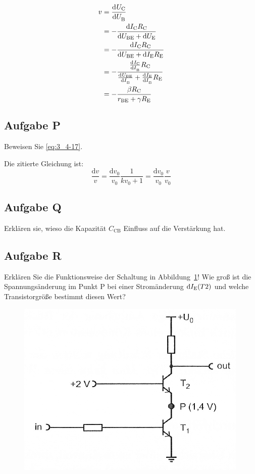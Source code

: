 \begin{align*}
	v &= \dod \UC\UB\\
	  &= -\frac{\dif\IC\RC}{\dif\UBE + \dif\UE}\\
	  &= -\frac{\dif\IC\RC}{\dif\UBE + \dif\IE\RE}\\
	  &= -\frac{\od\IC\IB\RC}{\od\UBE\IB+\od\IE\IB\RE}\\
	  &= -\frac{\beta\RC}{r_\text{BE}+\gamma\RE}
\end{align*}

\FloatBarrier
\subsection{Aufgabe P}

\begin{problem}
	Beweisen Sie \eqref{eq:3_4-17}.
\end{problem}

Die zitierte Gleichung ist:
\begin{equation}
	\label{eq:3_4-17}
	\frac{\mathrm d v} v
	= \frac{\mathrm d v_0}{v_0} \frac{1}{k v_0 + 1}
	= \frac{\mathrm d v_0}{v_0} \frac{v}{v_0}
\end{equation}

\fehlt

\FloatBarrier
\subsection{Aufgabe Q}

\begin{problem}
	Erklären sie, wieso die Kapazität $C_\text{CB}$ Einfluss auf die
	Verstärkung hat.
\end{problem}

\fehlt

\FloatBarrier
\subsection{Aufgabe R}

\begin{problem}
	Erklären Sie die Funktionsweise der Schaltung in
	Abbildung~\ref{fig:3_4-15}! Wie groß ist die Spannungsänderung im Punkt P
	bei einer Stromänderung $\mathrm d I_\text{E}(T2)$ und welche
	Transistorgröße bestimmt diesen Wert?
\end{problem}

\begin{figure}[htbp]
	\centering
	\includegraphics[width=.6\textwidth]{Anleitung/3_4-15.png}
	\caption{%
		\cite[Abbildung~3/4.15]{physik313-Anleitung}
	}
	\label{fig:3_4-15}
\end{figure}

